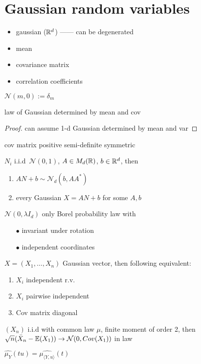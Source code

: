 \section{Gaussian random variables}\label{sec:gaussion-random-variables}


\begin{itemize}
    \item gaussian ($\mathbb{R}^d$) ------ can be degenerated
    \item mean
    \item covariance matrix
    \item correlation coefficients
\end{itemize}

\begin{fact}
    $\mathcal{N}(m, 0) := \delta_m$
\end{fact}

\begin{prop}
    law of Gaussian determined by mean and cov
\end{prop}
\begin{proof}
    can assume 1-d Gaussian determined by mean and var
\end{proof}

\begin{fact}
    cov matrix positive semi-definite symmetric
\end{fact}

\begin{prop}
    $N_i$ i.i.d\ $\mathcal{N}(0, 1)$, $A \in M_d(\mathbb{R})$, $b \in \mathbb{R}^d$, then
    \begin{enumerate}
        \item $AN + b \sim \mathcal{N}_d(b, AA^*)$
        \item every Gaussian $X = AN + b$ for some $A, b$
    \end{enumerate}
\end{prop}

\begin{fact}
    $\mathcal{N}(0, \lambda I_d)$ only Borel probability law with
    \begin{itemize}
        \item[$\bullet$] invariant under rotation
        \item[$\bullet$] independent coordinates
    \end{itemize}
\end{fact}

\begin{prop}
    $X = (X_1, \dots, X_n)$ Gaussian vector, then following equivalent:
    \begin{enumerate}
        \item $X_i$ independent r.v.\
        \item $X_i$ pairwise independent
        \item Cov matrix diagonal
    \end{enumerate}
\end{prop}

\begin{thm}
    $(X_n)$ i.i.d with common law $\mu$, finite moment of order 2, then $\sqrt{n}(\bar{X}_n - \mathbb{E}(X_1)) \rightarrow \mathcal{N}(0, Cov(X_1))$ in law
\end{thm}

\begin{fact}
    $\widehat{\mu_Y}(tu) = \widehat{\mu_{\langle Y, u \rangle}}(t)$
\end{fact}